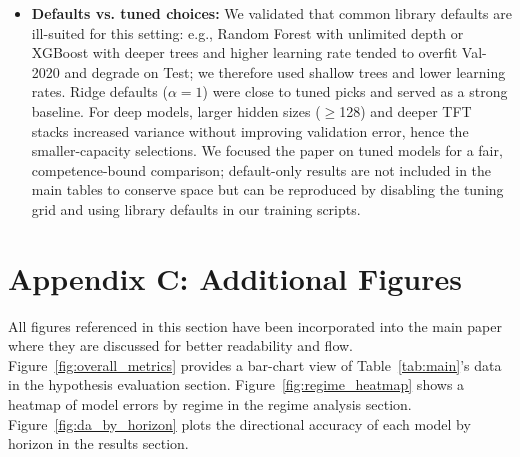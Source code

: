 \documentclass[10pt,twocolumn]{article}
\begin{document}
\begin{small}
\begin{itemize}
\begin{itemize}
            \item \emph{Random Forest:} $n$\,estimators $\in\{100,300\}$, max\_depth $\in\{\texttt{None},5,7\}$, min\_samples\_leaf $\in\{1,5,10\}$; we constrained depth to mitigate overfitting on a small daily panel.
            \item \emph{XGBoost:} max\_depth $\in\{3,4,5\}$, learning rate $\in\{0.05,0.1\}$, subsample/colsample\_bytree $\in\{0.7,1.0\}$; number of rounds selected via early stopping on Val-2020, then refit.
            \item \emph{GRU/LSTM:} hidden units $\in\{32,64,128\}$, dropout $\in\{0.1,0.2,0.3\}$, learning rate $\in\{5\times10^{-4},1\times10^{-3}\}$, weight decay $\in\{0,10^{-5},10^{-4}\}$; 1 layer favored for bias/variance balance.
            \item \emph{TFT:} attention heads $\in\{2,4\}$, transformer layers $\in\{1,2\}$, hidden size $\in\{16,32\}$, dropout $\in\{0.2,0.3,0.4\}$, learning rate $\in\{3\times10^{-4},1\times10^{-3}\}$. We intentionally kept capacity modest given dataset size and absence of rich exogenous covariates.
        \end{itemize}
        \item \textbf{Defaults vs. tuned choices:} We validated that common library defaults are ill-suited for this setting: e.g., Random Forest with unlimited depth or XGBoost with deeper trees and higher learning rate tended to overfit Val-2020 and degrade on Test; we therefore used shallow trees and lower learning rates. Ridge defaults ($\alpha{=}1$) were close to tuned picks and served as a strong baseline. For deep models, larger hidden sizes ($\geq$128) and deeper TFT stacks increased variance without improving validation error, hence the smaller-capacity selections. We focused the paper on tuned models for a fair, competence-bound comparison; default-only results are not included in the main tables to conserve space but can be reproduced by disabling the tuning grid and using library defaults in our training scripts.
\end{itemize}
\end{small}

\section*{Appendix C: Additional Figures}
All figures referenced in this section have been incorporated into the main paper where they are discussed for better readability and flow. Figure~\ref{fig:overall_metrics} provides a bar-chart view of Table~\ref{tab:main}'s data in the hypothesis evaluation section. Figure~\ref{fig:regime_heatmap} shows a heatmap of model errors by regime in the regime analysis section. Figure~\ref{fig:da_by_horizon} plots the directional accuracy of each model by horizon in the results section.
\end{document}
